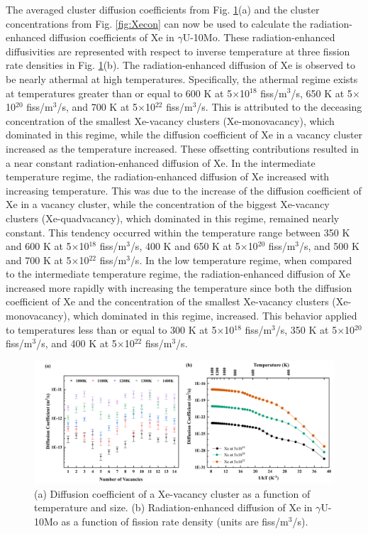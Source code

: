 \documentclass[preprint,12pt]{elsarticle}
\begin{document}
\indent The averaged cluster diffusion coefficients from Fig.  \ref{fig:Xediff}(a) and the cluster concentrations from Fig. \ref{fig:Xecon} can now be used to calculate the radiation-enhanced diffusion coefficients of Xe in $\gamma$U-10Mo. These radiation-enhanced diffusivities are represented with respect to inverse temperature at three fission rate densities in Fig. \ref{fig:Xediff}(b). The radiation-enhanced diffusion of Xe is observed to be nearly athermal at high temperatures. Specifically, the athermal regime exists at temperatures greater than or equal to 600 K at 5$\times$10$^{18}$ fiss/m$^{3}$/s, 650 K at 5$\times$10$^{20}$ fiss/m$^{3}$/s, and 700 K at 5$\times$10$^{22}$ fiss/m$^{3}$/s. This is attributed to the deceasing concentration of the smallest Xe-vacancy clusters (Xe-monovacancy), which dominated in this regime, while the diffusion coefficient of Xe in a vacancy cluster increased as the temperature increased. These offsetting contributions resulted in a near constant radiation-enhanced diffusion of Xe. In the intermediate temperature regime, the radiation-enhanced diffusion of Xe increased with increasing temperature. This was due to the increase of the diffusion coefficient of Xe in a vacancy cluster, while the concentration of the biggest Xe-vacancy clusters (Xe-quadvacancy), which dominated in this regime, remained nearly constant. This tendency  occurred within the temperature range between 350 K and 600 K at 5$\times$10$^{18}$ fiss/m$^{3}$/s, 400 K and 650 K at 5$\times$10$^{20}$ fiss/m$^{3}$/s, and 500 K and 700 K at 5$\times$10$^{22}$ fiss/m$^{3}$/s. In the low temperature regime, when compared to the intermediate temperature regime, the radiation-enhanced diffusion of Xe increased more rapidly with increasing the temperature since both the diffusion coefficient of Xe and the concentration of the smallest Xe-vacancy clusters (Xe-monovacancy), which dominated in this regime, increased. This behavior applied to temperatures less than or equal to 300 K at 5$\times$10$^{18}$ fiss/m$^{3}$/s, 350 K at 5$\times$10$^{20}$ fiss/m$^{3}$/s, and 400 K at 5$\times$10$^{22}$ fiss/m$^{3}$/s.\\

\begin{figure}[hbt!]
\centering
\includegraphics[width=1\textwidth]{Fig9.png}
\caption{(a) Diffusion coefficient of a Xe-vacancy cluster as a function of temperature and size. (b) Radiation-enhanced diffusion of Xe in $\gamma$U-10Mo as a function of fission rate density (units are fiss/m$^{3}$/s). }
\label{fig:Xediff}
\end{figure}
\end{document}
